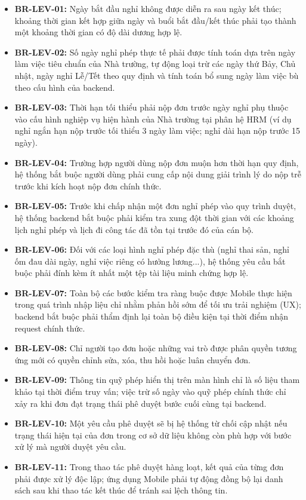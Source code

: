 \begin{itemize}[leftmargin=1.5cm]
    \item \textbf{BR-LEV-01:} Ngày bắt đầu nghỉ không được diễn ra sau ngày kết thúc; khoảng thời gian kết hợp giữa ngày và buổi bắt đầu/kết thúc phải tạo thành một khoảng thời gian có độ dài dương hợp lệ.
    \item \textbf{BR-LEV-02:} Số ngày nghỉ phép thực tế phải được tính toán dựa trên ngày làm việc tiêu chuẩn của Nhà trường, tự động loại trừ các ngày thứ Bảy, Chủ nhật, ngày nghỉ Lễ/Tết theo quy định và tính toán bổ sung ngày làm việc bù theo cấu hình của backend.
    \item \textbf{BR-LEV-03:} Thời hạn tối thiểu phải nộp đơn trước ngày nghỉ phụ thuộc vào cấu hình nghiệp vụ hiện hành của Nhà trường tại phân hệ HRM (ví dụ nghỉ ngắn hạn nộp trước tối thiểu 3 ngày làm việc; nghỉ dài hạn nộp trước 15 ngày).
    \item \textbf{BR-LEV-04:} Trường hợp người dùng nộp đơn muộn hơn thời hạn quy định, hệ thống bắt buộc người dùng phải cung cấp nội dung giải trình lý do nộp trễ trước khi kích hoạt nộp đơn chính thức.
    \item \textbf{BR-LEV-05:} Trước khi chấp nhận một đơn nghỉ phép vào quy trình duyệt, hệ thống backend bắt buộc phải kiểm tra xung đột thời gian với các khoảng lịch nghỉ phép và lịch đi công tác đã tồn tại trước đó của cán bộ.
    \item \textbf{BR-LEV-06:} Đối với các loại hình nghỉ phép đặc thù (nghỉ thai sản, nghỉ ốm đau dài ngày, nghỉ việc riêng có hưởng lương...), hệ thống yêu cầu bắt buộc phải đính kèm ít nhất một tệp tài liệu minh chứng hợp lệ.
    \item \textbf{BR-LEV-07:} Toàn bộ các bước kiểm tra ràng buộc được Mobile thực hiện trong quá trình nhập liệu chỉ nhằm phản hồi sớm để tối ưu trải nghiệm (UX); backend bắt buộc phải thẩm định lại toàn bộ điều kiện tại thời điểm nhận request chính thức.
    \item \textbf{BR-LEV-08:} Chỉ người tạo đơn hoặc những vai trò được phân quyền tương ứng mới có quyền chỉnh sửa, xóa, thu hồi hoặc luân chuyển đơn.
    \item \textbf{BR-LEV-09:} Thông tin quỹ phép hiển thị trên màn hình chỉ là số liệu tham khảo tại thời điểm truy vấn; việc trừ số ngày vào quỹ phép chính thức chỉ xảy ra khi đơn đạt trạng thái phê duyệt bước cuối cùng tại backend.
    \item \textbf{BR-LEV-10:} Một yêu cầu phê duyệt sẽ bị hệ thống từ chối cập nhật nếu trạng thái hiện tại của đơn trong cơ sở dữ liệu không còn phù hợp với bước xử lý mà người duyệt yêu cầu.
    \item \textbf{BR-LEV-11:} Trong thao tác phê duyệt hàng loạt, kết quả của từng đơn phải được xử lý độc lập; ứng dụng Mobile phải tự động đồng bộ lại danh sách sau khi thao tác kết thúc để tránh sai lệch thông tin.
\end{itemize}


